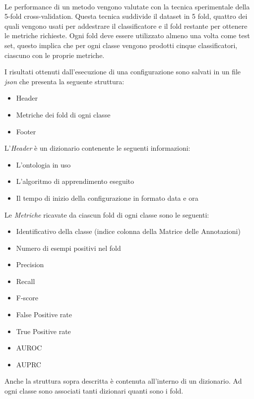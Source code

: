 \documentclass[12pt,a4paper,oneside,hidelinks]{report}
\begin{document}
\paragraph*{}
Le performance di un metodo vengono valutate con la tecnica sperimentale della 5-fold cross-validation. Questa tecnica suddivide il dataset in 5 fold, quattro dei quali vengono usati per addestrare il classificatore e il fold restante per ottenere le metriche richieste. Ogni fold deve essere utilizzato almeno una volta come test set, questo implica che per ogni classe vengono prodotti cinque classificatori, ciascuno con le proprie metriche.

I risultati ottenuti dall'esecuzione di una configurazione sono salvati in un file \textit{json} che presenta la seguente struttura:

\begin{itemize}
    \item Header
    \item Metriche dei fold di ogni classe
    \item Footer
\end{itemize}
L'\textit{Header} è un dizionario contenente le seguenti informazioni:
\begin{itemize}
    \item L'ontologia in uso
    \item L'algoritmo di apprendimento eseguito
    \item Il tempo di inizio della configurazione in formato data e ora
\end{itemize}
Le \textit{Metriche} ricavate da ciascun fold di ogni classe sono le seguenti:
\begin{itemize}
    \item Identificativo della classe (indice colonna della Matrice delle Annotazioni)
    \item Numero di esempi positivi nel fold
    \item Precision
    \item Recall
    \item F-score
    \item False Positive rate
    \item True Positive rate
    \item AUROC
    \item AUPRC
\end{itemize}
Anche la struttura sopra descritta è contenuta all'interno di un dizionario. Ad ogni classe sono associati tanti dizionari quanti sono i fold.
\end{document}
